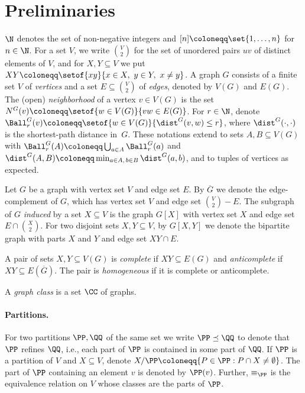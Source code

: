 
\section{Preliminaries}\label{sec:prelims}

$\N$ denotes the set of non-negative integers and $[n]\coloneqq\set{1,\ldots,n}$ for $n\in\N$.
For a set $V$, we write $\binom V2$ for the set of unordered pairs $uv$ of distinct elements of $V$, and for $X,Y\subseteq V$ we put $XY\coloneqq\setof{xy}{x\in X,\ y\in Y,\ x\ne y}$. A graph $G$ consists of a finite set $V$ of \emph{vertices} and a set $E\subseteq {V\choose 2}$ of \emph{edges}, denoted by $V(G)$ and $E(G)$.
The (open) \emph{neighborhood} of a vertex $v\in V(G)$ is the set $N^G(v)\coloneqq\setof{w\in V(G)}{vw\in E(G)}$.
For $r\in \N$, denote $\Ball^G_r(v)\coloneqq\setof{w\in V(G)}{\dist^G(v,w)\le r}$, where $\dist^G(\cdot,\cdot)$ is the shortest-path distance in~$G$.
These notations extend to sets $A,B\subseteq V(G)$ with $\Ball_r^G(A) \coloneqq \bigcup_{a\in A} \Ball_r^G(a)$ and $\dist^G(A,B)\coloneqq\min_{a\in A,\,b\in B}\dist^G(a,b)$, and to tuples of vertices as expected.

Let $G$ be a graph with vertex set $V$ and edge set $E$. By $\overline G$ we denote the edge-complement of $G$, which has  vertex set $V$ and edge set ${V\choose 2}-E$.
The subgraph of $G$ \emph{induced} by a set $X\subseteq V$ is the graph $G[X]$ with vertex set $X$ and edge set $E\cap {X\choose 2}$. For two disjoint sets $X,Y\subseteq V$,
by $G[X,Y]$ we denote the bipartite graph with parts $X$ and $Y$ and edge set $XY\cap E$.

A pair of sets $X,Y\subseteq V(G)$ is \emph{complete} if $XY\subseteq E(G)$ and \emph{anticomplete} if $XY\subseteq E(\overline G)$. The pair is \emph{homogeneous} if it is complete or anticomplete.

A \emph{graph class} is a set $\CC$ of graphs.

\paragraph{Partitions.}
For two partitions $\PP,\QQ$ of the same set we write $\PP\preceq \QQ$ to denote that $\PP$ refines $\QQ$, i.e., each part of $\PP$ is contained in some part of $\QQ$.
If $\PP$ is a partition of $V$ and $X\subseteq V$, denote
$X/\PP\coloneqq\{P\in\PP:P\cap X\ne\emptyset\}$.
The part of $\PP$ containing an element $v$ is denoted by $\PP(v)$.
Further, $\equiv_\PP$ is the equivalence relation on $V$ whose classes are the parts of $\PP$.

